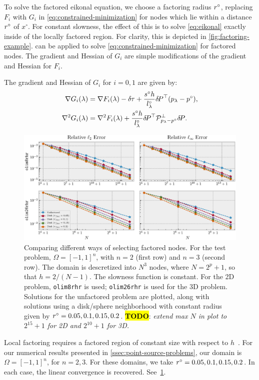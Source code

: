 \documentclass[eikonal.tex]{subfiles}
\begin{document}
To solve the factored eikonal equation, we choose a factoring radius
$r^\circ$, replacing $F_i$ with $G_i$ in
\cref{eq:constrained-minimization} for nodes which lie within a
distance $r^\circ$ of $x^\circ$. For constant slowness, the effect of
this is to solve \cref{eq:eikonal} exactly inside of the locally
factored region. For clarity, this is depicted in
\cref{fig:factoring-example}.  can be applied to
solve \cref{eq:constrained-minimization} for factored nodes. The
gradient and Hessian of $G_i$ are simple modifications of the gradient
and Hessian for $F_i$.

\begin{lemma}
  The gradient and Hessian of $G_i$ for $i = 0, 1$ are given
  by:
  \begin{align}
    \label{eq:G-grad-hess}
    \nabla G_i(\lambda) &= \nabla F_i(\lambda) - \deltau + \frac{s^\circ h}{l^\circ_\lambda} \delP^\top {(p_\lambda - p^\circ)}, \\
    \nabla^2 G_i(\lambda) &= \nabla^2 F_i(\lambda) + \frac{s^\circ h}{l^\circ_\lambda} \delP^\top \calP^\perp_{p_\lambda - p^\circ} \delP.
  \end{align}
\end{lemma}

\begin{figure}[t]
  \centering
  \includegraphics[width=\linewidth]{factoring-error-example.eps}
  \caption{Comparing different ways of selecting factored nodes. For
    the test problem, $\Omega = [-1, 1]^n$, with $n = 2$ (first row)
    and $n = 3$ (second row). The domain is descretized into $N^3$
    nodes, where $N = 2^p + 1$, so that $h = 2/(N - 1)$. The slowness
    function is constant. For the 2D problem, \texttt{olim8rhr} is
    used; \texttt{olim26rhr} is used for the 3D problem. Solutions for
    the unfactored problem are plotted, along with solutions using a
    disk/sphere neighborhood with constant radius given by
    $r^\circ = 0.05, 0.1, 0.15, 0.2$. \hl{\textbf{TODO}}: \emph{extend
      max $N$ in plot to $2^{15} + 1$ for 2D and $2^{10} + 1$ for
      3D.}}\label{fig:factoring-error-example}
\end{figure}

Local factoring requires a factored region of constant size with
respect to $h$~\cite{qi2018corner}. For our numerical results
presented in \cref{ssec:point-source-problems}, our domain is
$\Omega = [-1, 1]^n$, for $n = 2, 3$. For these domains, we take
$r^\circ = 0.05, 0.1, 0.15, 0.2$. In each case, the linear convergence
is recovered. See~\cref{fig:factoring-error-example}.
\end{document}
